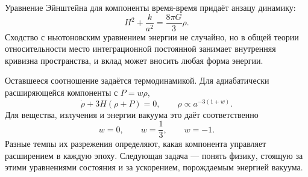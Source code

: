 Уравнение Эйнштейна для компоненты время-время придаёт анзацу динамику:
\begin{equation}
H^2+\frac{k}{a^2}=\frac{8\pi G}{3}\rho.
\end{equation}
Сходство с ньютоновским уравнением энергии не случайно, но в общей теории относительности место интеграционной постоянной занимает внутренняя кривизна пространства, и вклад может вносить любая форма энергии.

Оставшееся соотношение задаётся термодинамикой. Для адиабатически расширяющейся компоненты с \(P=w\rho\),
\begin{equation}
\dot\rho+3H(\rho+P)=0,
\qquad
\rho\propto a^{-3(1+w)}.
\end{equation}
Для вещества, излучения и энергии вакуума это даёт соответственно
\begin{equation}
w=0,\qquad w=\frac13,\qquad w=-1.
\end{equation}
Разные темпы их разрежения определяют, какая компонента управляет расширением в каждую эпоху. Следующая задача — понять физику, стоящую за этими уравнениями состояния и за ускорением, порождаемым энергией вакуума.
